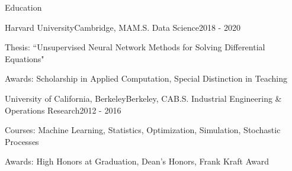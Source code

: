 \documentclass{resume} %
\begin{document}

\begin{rSection}{Education}

\begin{rSubsection}{Harvard University}{Cambridge, MA}{M.S. Data Science}{2018 - 2020}
	\item Thesis: ``Unsupervised Neural Network Methods for Solving Differential Equations"
	\item Awards: Scholarship in Applied Computation, Special Distinction in Teaching
\end{rSubsection}
\begin{rSubsection}{University of California, Berkeley}{Berkeley, CA}{B.S. Industrial Engineering \& Operations Research}{2012 - 2016}
	\item Courses: Machine Learning, Statistics, Optimization, Simulation, Stochastic Processes
	\item Awards: High Honors at Graduation, Dean's Honors, Frank Kraft Award
\end{rSubsection}

\end{rSection}
\end{document}

